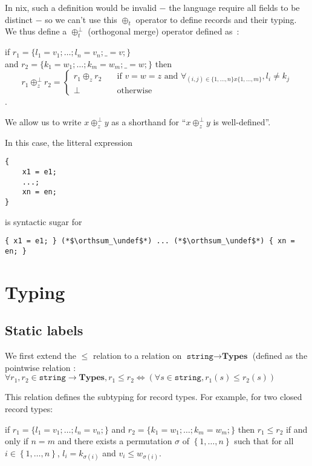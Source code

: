 \documentclass{article}
\newcommand{\ty}[1]{\texttt{#1}}
\newcommand{\undef}{\oslash}
\newcommand{\orthsum}{\oplus^\bot}
\newcommand{\subtype}{\leq}
\newcommand{\Γ}{\Gamma}
\newcommand{\τ}{\tau}
\newcommand{\σ}{\sigma}
\begin{document}
In nix, such a definition would be invalid − the language require all
fields to be distinct − so we can't use this $\oplus_t$ operator to
define records and their typing.
We thus define a $\orthsum_t$ (orthogonal merge) operator defined as~:

if $r_1 = \{ l_1 = v_1; \ldots{}; l_n = v_n; \_ = v; \}$ \\
and $r_2 = \{ k_1 = w_1; \ldots{}; k_m = w_m; \_ = w; \}$
then
\[
  r_1 \orthsum_z r_2 =
  \begin{cases}
    r_1 \oplus_z r_2
      & \quad \text{if } v = w = z \text{\ and }
      \forall_{(i,j) \in \{1, \ldots{}, n \} x \{1, \ldots{}, m \}},
        l_i \neq k_j \\
    \bot & \quad \text{otherwise}
  \end{cases}
\].

We allow us to write $x \orthsum_z y$ as a shorthand for ``$x \orthsum_z y$ is
well-defined''.

In this case, the litteral expression

\begin{lstlisting}
{
    x1 = e1;
    ...;
    xn = en;
}
\end{lstlisting}

is syntactic sugar for

\begin{lstlisting}
{ x1 = e1; } (*$\orthsum_\undef$*) ... (*$\orthsum_\undef$*) { xn = en; }
\end{lstlisting}

\section{Typing}
\subsection{Static labels}

We first extend the $\subtype$ relation to a relation on $\ty{string}
\rightarrow \textbf{Types}$ (defined as the pointwise relation : $\forall r_1,
r_2 \in \ty{string} \rightarrow \textbf{Types}, r_1 \subtype r_2
\Leftrightarrow \left( \forall s \in \ty{string}, r_1(s) \subtype r_2(s)
\right)$

This relation defines the subtyping for record types. For example, for two
closed record types:

if $r_1 = \{ l_1 = v_1; \ldots{}; l_n = v_n; \}$
and $r_2 = \{ k_1 = w_1; \ldots{}; k_m = w_m; \}$
then
$r_1 \subtype r_2$ if and only if $n = m$ and there exists a permutation $\σ$
of $\left\{1, \ldots{}, n\right\}$ such that for all $i \in \left\{1, \ldots{},
n\right\}$, $l_i = k_{\σ(i)}$ and $v_i \subtype w_{\σ(i)}$.
\end{document}
